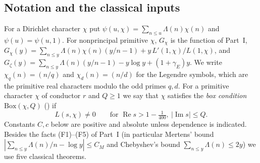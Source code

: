 \documentclass[11pt]{amsart}
\newcommand{\re}{\operatorname{Re}}
\newcommand{\im}{\operatorname{Im}}
\newcommand{\gE}{\gamma_{E}}
\theoremstyle{plain}
\theoremstyle{definition}
\numberwithin{equation}{section}
\begin{document}
\subsection{Notation and the classical inputs}

For a Dirichlet character $\chi$ put $\psi(u,\chi)=\sum_{n\le u}\Lambda(n)\chi(n)$ and
$\psi(u)=\psi(u,1)$. For nonprincipal primitive $\chi$, $G_\chi$ is the function of Part~I,
$G_\chi(y)=\sum_{n\le y}\Lambda(n)\chi(n)(y/n-1)+y\,L'(1,\chi)/L(1,\chi)$, and $G_\zeta(y)=
\sum_{n\le y}\Lambda(n)(y/n-1)-y\log y+(1+\gE)y$. We write $\chi_q(n)=(n/q)$ and
$\chi_d(n)=(n/d)$ for the Legendre symbols, which are the primitive real characters modulo the odd
primes $q,d$. For a primitive character $\chi$ of conductor $r$ and $Q\ge1$ we say that $\chi$
satisfies the \emph{box condition} $\mathrm{Box}(\chi,Q)$ () if
\[
L(s,\chi)\neq0\qquad\text{for }\re s>1-\tfrac1{400},\ |\im s|\le Q.
\]
Constants $C,c$ below are positive and absolute unless dependence is indicated. Besides the facts
(F1)--(F5) of Part~I (in particular Mertens' bound $|\sum_{n\le y}\Lambda(n)/n-\log y|\le C_M$
and Chebyshev's bound $\sum_{n\le y}\Lambda(n)\le2y$) we use five classical theorems.
\end{document}
